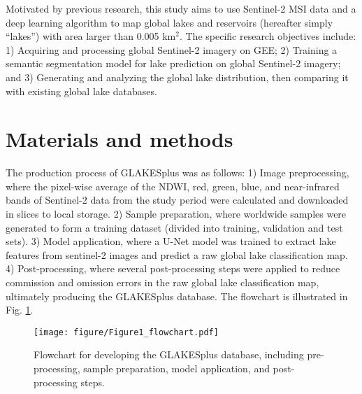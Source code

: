 \documentclass[preprint,12pt,authoryear]{elsarticle}
\begin{document}
Motivated by previous research, this study aims to use Sentinel-2 MSI data and a deep learning algorithm to map global lakes and reservoirs (hereafter simply “lakes”) with area larger than 0.005 km$^2$. The specific research objectives include: 1) Acquiring and processing global Sentinel-2 imagery on GEE; 2) Training a semantic segmentation model for lake prediction on global Sentinel-2 imagery; and 3) Generating and analyzing the global lake distribution, then comparing it with existing global lake databases.

\section{Materials and methods}
\label{sec2}
The production process of GLAKESplus was as follows: 1) Image preprocessing, where the pixel-wise average of the NDWI, red, green, blue, and near-infrared bands of Sentinel-2 data from the study period were calculated and downloaded in slices to local storage. 2) Sample preparation, where worldwide samples were generated to form a training dataset (divided into training, validation and test sets). 3) Model application, where a U-Net model was trained to extract lake features from sentinel-2 images and predict a raw global lake classification map. 4) Post-processing, where several post-processing steps were applied to reduce commission and omission errors in the raw global lake classification map, ultimately producing the GLAKESplus database. The flowchart is illustrated in Fig. \ref{fig:Fig1}.

\begin{figure}[h]
    \centering
    \texttt{[image: figure/Figure1\_flowchart.pdf]}
    \caption{Flowchart for developing the GLAKESplus database, including pre-processing, sample preparation, model application, and post-processing steps.}
    \label{fig:Fig1}
\end{figure}
\end{document}
